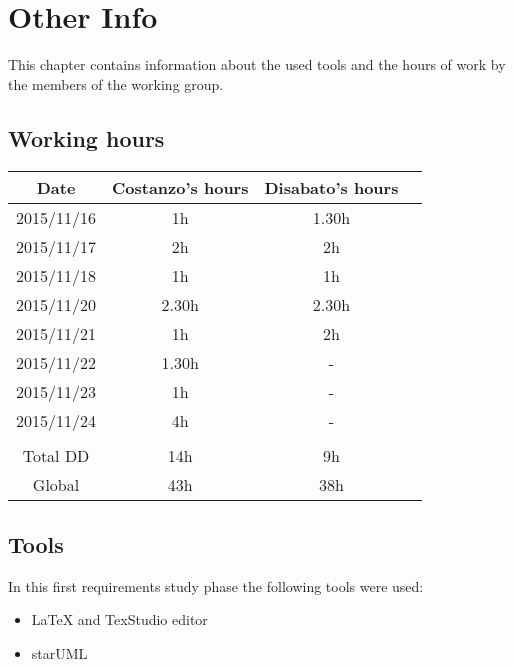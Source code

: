 \documentclass[\mainpath/main]{subfiles}
\begin{document}
\chapter{Other Info}
\label{other_info}

\setmyfancystyle

This chapter contains information about the used tools and the hours of work by the members of the working group.

\section{Working hours}
\begin{table}[h!]
\begin{tabular}{cccc}
\hline
Date & 		 Costanzo's hours & Disabato's hours  & \\ \hline
2015/11/16 & 1h 			  & 1.30h 			  & \\ \hline
2015/11/17 & 2h 			  & 2h 				  & \\ \hline 
2015/11/18 & 1h 			  & 1h 				  & \\ \hline
2015/11/20 & 2.30h 			  & 2.30h 			  & \\ \hline
2015/11/21 & 1h 			  & 2h 				  & \\ \hline
2015/11/22 & 1.30h 			  & - 				  & \\ \hline
2015/11/23 & 1h				  & -                 & \\ \hline
2015/11/24 & 4h				  & -				  & \\ \hline
\\
Total DD   & 14h 			  & 9h 				  & \\ \hline
Global 	   & 43h 		  	  & 38h 			  & \\ \hline

\end{tabular}
\end{table}

\section{Tools}
In this first requirements study phase the following tools were used:
\begin{itemize}
	\item \LaTeX{} and TexStudio editor
	\item starUML
\end{itemize}
\end{document}
